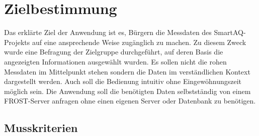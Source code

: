 \section{Zielbestimmung}
Das erklärte Ziel der Anwendung ist es, Bürgern die Messdaten des SmartAQ-Projekts auf eine ansprechende Weise zugänglich zu machen.
Zu diesem Zweck wurde eine Befragung der Zielgruppe durchgeführt, auf deren Basis die angezeigten Informationen ausgewählt wurden.
Es sollen nicht die rohen Messdaten im Mittelpunkt stehen sondern die Daten im verständlichen Kontext dargestellt werden.
Auch soll die Bedienung intuitiv ohne Eingewöhnungszeit möglich sein.
Die Anwendung soll die benötigten Daten selbstständig von einem FROST-Server anfragen ohne einen eigenen Server oder Datenbank zu benötigen.

\subsection{Musskriterien}
\setcounter{counter}{10}

